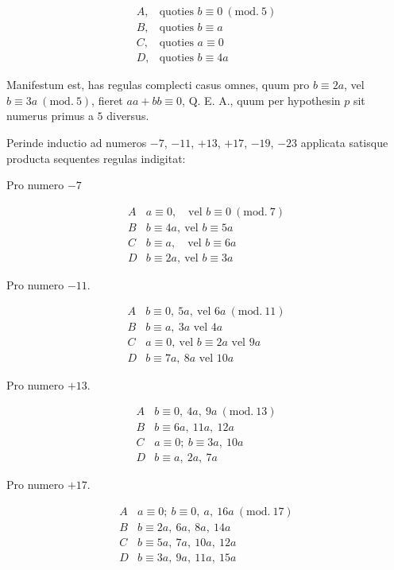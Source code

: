 %
\[
\begin{array}{ll}
A,&\text{quoties }b\equiv0\ (\mathrm{mod.}\ 5)\\
B,&\text{quoties }b\equiv a\\
C,&\text{quoties }a\equiv0\\
D,&\text{quoties }b\equiv4a
\end{array}
\]

Manifestum est, has regulas complecti casus omnes, quum pro $b\equiv2a$, vel $b\equiv3a\ (\mathrm{mod.}\ 5)$, fieret $aa+bb\equiv0$, Q. E. A., quum per hypothesin $p$ sit numerus primus a $5$ diversus.

Perinde inductio ad numeros $-7$, $-11$, $+13$, $+17$, $-19$, $-23$ applicata satisque producta sequentes regulas indigitat:
\begin{center}Pro numero $-7$\end{center}
\[
\begin{array}{c|l}
A&a\equiv0,\quad\text{vel }b\equiv0\ (\mathrm{mod.}\ 7)\\
B&b\equiv4a,\ \text{vel }b\equiv5a\\
C&b\equiv a,\quad\text{vel }b\equiv6a\\
D&b\equiv2a,\ \text{vel }b\equiv3a
\end{array}
\]

\begin{center}Pro numero $-11$.\end{center}
\[
\begin{array}{c|l}
A&b\equiv0,\ 5a,\ \text{vel }6a\ (\mathrm{mod.}\ 11)\\
B&b\equiv a,\ 3a\text{ vel }4a\\
C&a\equiv0,\ \text{vel }b\equiv2a\text{ vel }9a\\
D&b\equiv7a,\ 8a\text{ vel }10a
\end{array}
\]

\begin{center}Pro numero $+13$.\end{center}
\[
\begin{array}{c|l}
A&b\equiv0,\ 4a,\ 9a\ (\mathrm{mod.}\ 13)\\
B&b\equiv6a,\ 11a,\ 12a\\
C&a\equiv0;\ b\equiv3a,\ 10a\\
D&b\equiv a,\ 2a,\ 7a
\end{array}
\]

\begin{center}Pro numero $+17$.\end{center}
\[
\begin{array}{c|l}
A&a\equiv0;\ b\equiv0,\ a,\ 16a\ (\mathrm{mod.}\ 17)\\
B&b\equiv2a,\ 6a,\ 8a,\ 14a\\
C&b\equiv5a,\ 7a,\ 10a,\ 12a\\
D&b\equiv3a,\ 9a,\ 11a,\ 15a
\end{array}
\]

